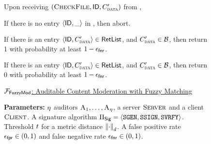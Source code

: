 \begin{figure}[h]
{\begin{minipage}[t]{0.45\textwidth}
		
		\item Upon receiving $(\checkContent,  \genericFileID, \clientMeta')$ from \server, 
		\enumListStartResume

		\item If there is no entry $\langle \mathsf{ID}, \_ \rangle$ in \keyList, then abort. 
		
		\item If there is an entry $\langle \genericFileID, \clientMeta' \rangle \in \retList$, and $\clientMeta' \in \blocklist$, then return 1 with probability at least $1 - \epsilon_\mathsf{fnr}$. 

		\item If there is an entry $\langle \genericFileID, \clientMeta' \rangle \in \retList$, and $\clientMeta' \in \blocklist$, then return 0 with probability at least $1 - \epsilon_\mathsf{fnr}$.  


	

		\enumListEnd

			\enumListEnd


\end{minipage}
\hspace{5pt}
\vrule
\hspace{5pt}


\begin{minipage}[t]{0.45\textwidth}
\footnotesize

\noindent\underline{$\mathcal{F}_{\mathsf{FuzzyMod}}$: Auditable Content Moderation with Fuzzy Matching}
		
		

		\smallskip\noindent\textbf{Parameters:} $\eta$ auditors $\auditor[1], \dots, \auditor[\numAuditors]$, a server $\textsc{Server}$ and a client $\textsc{Client}$. A signature algorithm $\sigSchemeDefn$. 
Threshold $t$ for a metric distance $\distanceNotation[\distance][\cdot]$. A false positive rate $\epsilon_\mathsf{fpr} \in (0, 1)$ and false negative rate $\epsilon_\mathsf{fnr} \in (0,1)$. 
		

\end{minipage}}
\end{figure}
